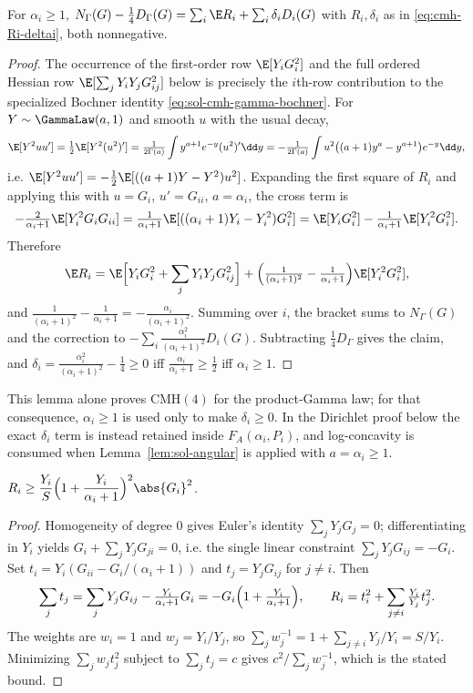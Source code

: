 \documentclass[../main.tex]{subfiles}
\begin{document}
\begin{lemma}[= Lemma~\ref{lem:cmh-gamma-completion}]
\label{lem:sol-gamma-completion}
For $\alpha_i\ge1$, $N_\Gamma(G)-\tfrac14D_\Gamma(G)=\sum_i\E R_i+\sum_i\delta_iD_i(G)$ with
$R_i,\delta_i$ as in \eqref{eq:cmh-Ri-deltai}, both nonnegative.
\end{lemma}

\begin{proof}
The occurrence of the first-order row
$\E[Y_iG_i^2]$ and the full ordered Hessian row
$\E[\sum_jY_iY_jG_{ij}^2]$ below is precisely the $i$th-row contribution to the specialized
Bochner identity \eqref{eq:sol-cmh-gamma-bochner}.
For $Y\sim\GammaLaw(a,1)$ and smooth $u$ with the usual decay,
\[
  \E[Y^2uu']=\tfrac12\E[Y^2(u^2)']
  =\tfrac1{2\Gamma(a)}\int y^{a+1}e^{-y}(u^2)'\dd y
  =-\tfrac1{2\Gamma(a)}\int u^2\bigl((a+1)y^a-y^{a+1}\bigr)e^{-y}\dd y,
\]
i.e. $\E[Y^2uu']=-\tfrac12\E[((a+1)Y-Y^2)u^2]$. Expanding the first square of $R_i$ and applying
this with $u=G_i$, $u'=G_{ii}$, $a=\alpha_i$, the cross term is
\[
  -\tfrac2{\alpha_i+1}\E[Y_i^2G_iG_{ii}]
  =\tfrac1{\alpha_i+1}\E[((\alpha_i+1)Y_i-Y_i^2)G_i^2]
  =\E[Y_iG_i^2]-\tfrac1{\alpha_i+1}\E[Y_i^2G_i^2].
\]
Therefore
\[
  \E R_i=\E\Bigl[Y_iG_i^2+\sum_jY_iY_jG_{ij}^2\Bigr]
  +\Bigl(\tfrac1{(\alpha_i+1)^2}-\tfrac1{\alpha_i+1}\Bigr)\E[Y_i^2G_i^2],
\]
and $\tfrac1{(\alpha_i+1)^2}-\tfrac1{\alpha_i+1}=-\tfrac{\alpha_i}{(\alpha_i+1)^2}$. Summing over
$i$, the bracket sums to $N_\Gamma(G)$ and the correction to
$-\sum_i\tfrac{\alpha_i^2}{(\alpha_i+1)^2}D_i(G)$. Subtracting $\tfrac14D_\Gamma$ gives the
claim, and $\delta_i=\tfrac{\alpha_i^2}{(\alpha_i+1)^2}-\tfrac14\ge0$ iff
$\tfrac{\alpha_i}{\alpha_i+1}\ge\tfrac12$ iff $\alpha_i\ge1$.
\end{proof}

This lemma alone proves $\mathrm{CMH}(4)$ for the product-Gamma law; for that consequence,
$\alpha_i\ge1$ is used only to make $\delta_i\ge0$. In the Dirichlet proof below the exact
$\delta_i$ term is instead retained inside $F_A(\alpha_i,P_i)$, and log-concavity is consumed
when Lemma~\ref{lem:sol-angular} is applied with $a=\alpha_i\ge1$.

\begin{lemma}[= Lemma~\ref{lem:cmh-row-min}]
\label{lem:sol-row-min}
$R_i\ge\dfrac{Y_i}S\Bigl(1+\dfrac{Y_i}{\alpha_i+1}\Bigr)^2\abs{G_i}^2$.
\end{lemma}

\begin{proof}
Homogeneity of degree $0$ gives Euler's identity $\sum_jY_jG_j=0$; differentiating in $Y_i$
yields $G_i+\sum_jY_jG_{ji}=0$, i.e. the single linear constraint $\sum_jY_jG_{ij}=-G_i$. Set
$t_i=Y_i(G_{ii}-G_i/(\alpha_i+1))$ and $t_j=Y_jG_{ij}$ for $j\ne i$. Then
\[
  \sum_jt_j=\sum_jY_jG_{ij}-\tfrac{Y_i}{\alpha_i+1}G_i=-G_i\Bigl(1+\tfrac{Y_i}{\alpha_i+1}\Bigr),
  \qquad
  R_i=t_i^2+\sum_{j\ne i}\tfrac{Y_i}{Y_j}t_j^2 .
\]
The weights are $w_i=1$ and $w_j=Y_i/Y_j$, so $\sum_jw_j^{-1}=1+\sum_{j\ne i}Y_j/Y_i=S/Y_i$.
Minimizing $\sum_jw_jt_j^2$ subject to $\sum_jt_j=c$ gives $c^2/\sum_jw_j^{-1}$, which is the
stated bound.
\end{proof}
\end{document}
